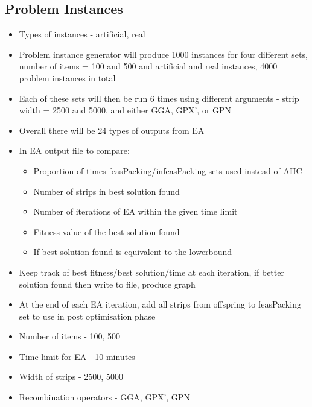 \documentclass{elsarticle}
\begin{document}
\subsection{Problem Instances}
\begin{itemize}
	\item Types of instances - artificial, real
	\item Problem instance generator will produce 1000 instances for four different sets, number of items = 100 and 500 and artificial and real instances, 4000 problem instances in total
	\item Each of these sets will then be run 6 times using different arguments - strip width = 2500 and 5000, and either GGA, GPX', or GPN
	\item Overall there will be 24 types of outputs from EA
	\item In EA output file to compare:
	\begin{itemize}
		\item Proportion of times feasPacking/infeasPacking sets used instead of AHC
		\item Number of strips in best solution found
		\item Number of iterations of EA within the given time limit
		\item Fitness value of the best solution found
		\item If best solution found is equivalent to the lowerbound
	\end{itemize}
	\item Keep track of best fitness/best solution/time at each iteration, if better solution found then write to file, produce graph
\item At the end of each EA iteration, add all strips from offspring to feasPacking set to use in post optimisation phase
\item Number of items - 100, 500
\item Time limit for EA - 10 minutes
\item Width of strips - 2500, 5000
\item Recombination operators - GGA, GPX', GPN
\end{itemize}
\end{document}
